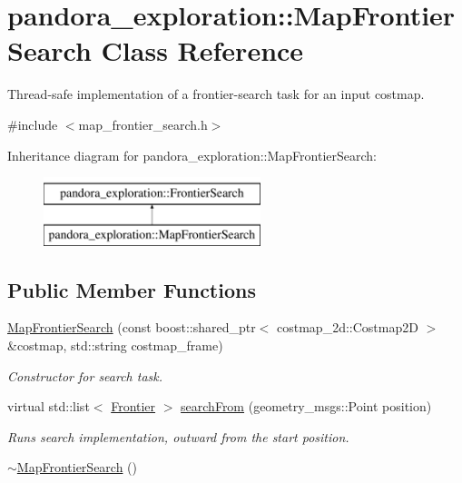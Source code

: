 \hypertarget{classpandora__exploration_1_1_map_frontier_search}{\section{pandora\-\_\-exploration\-:\-:\-Map\-Frontier\-Search \-Class \-Reference}
\label{classpandora__exploration_1_1_map_frontier_search}
}


\-Thread-\/safe implementation of a frontier-\/search task for an input costmap.  




{\ttfamily \#include $<$map\-\_\-frontier\-\_\-search.\-h$>$}

\-Inheritance diagram for pandora\-\_\-exploration\-:\-:\-Map\-Frontier\-Search\-:\begin{figure}[H]
\begin{center}
\leavevmode
\includegraphics[height=2.000000cm]{classpandora__exploration_1_1_map_frontier_search}
\end{center}
\end{figure}
\subsection*{\-Public \-Member \-Functions}
\begin{DoxyCompactItemize}
\item 
\hyperlink{classpandora__exploration_1_1_map_frontier_search_a0bbc0f03067d93638d0d0ec70b29d703}{\-Map\-Frontier\-Search} (const boost\-::shared\-\_\-ptr$<$ costmap\-\_\-2d\-::\-Costmap2\-D $>$ \&costmap, std\-::string costmap\-\_\-frame)
\begin{DoxyCompactList}\small\item\em \-Constructor for search task. \end{DoxyCompactList}\item 
virtual std\-::list$<$ \hyperlink{classpandora__exploration_1_1_frontier}{\-Frontier} $>$ \hyperlink{classpandora__exploration_1_1_map_frontier_search_ac948f0d38270a28905ea4f29e16270b2}{search\-From} (geometry\-\_\-msgs\-::\-Point position)
\begin{DoxyCompactList}\small\item\em \-Runs search implementation, outward from the start position. \end{DoxyCompactList}\item 
\hyperlink{classpandora__exploration_1_1_map_frontier_search_aca72d27c08f4a69516be48230ea76549}{$\sim$\-Map\-Frontier\-Search} ()
\end{DoxyCompactItemize}
